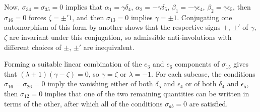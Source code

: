 \documentclass[pdftex]{sigma}
\numberwithin{equation}{section}
\begin{document}
Now, $\sigma_{34} = \sigma_{35} = 0$ implies that $\alpha_1 = \gamma \delta_4$, $\alpha_2 = -\gamma \delta_5$, $\beta_1 = -\gamma \epsilon_4$, $\beta_2 = \gamma \epsilon_5$, then $\sigma_{16} = 0$ forces $\zeta = \pm' 1$, and then $\sigma_{13} = 0$ implies $\gamma = \pm 1$. Conjugating one automorphism of this form by another shows that the respective signs $\pm$, $\pm'$ of $\gamma$, $\zeta$ are invariant under this conjugation, so admissible anti-involutions with different choices of $\pm$, $\pm'$ are inequivalent.

Forming a suitable linear combination of the $e_3$ and $e_6$ components of $\sigma_{15}$ gives that $(\lambda + 1)(\gamma - \zeta) = 0$, so $\gamma = \zeta$ or $\lambda = -1$. For each subcase, the conditions $\sigma_{16} = \sigma_{26} = 0$ imply the vanishing either of both $\delta_5$ and $\epsilon_4$ or of both $\delta_4$ and $\epsilon_5$, then $\sigma_{12} = 0$ implies that one of the two remaining quantities can be written in terms of the other, after which all of the conditions $\sigma_{ab} = 0$ are satisfied.
\end{document}
